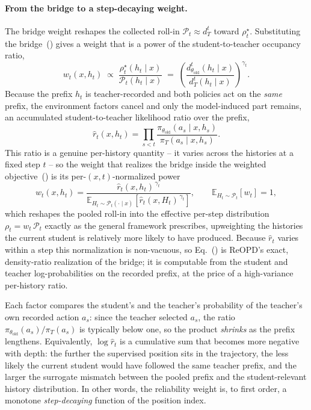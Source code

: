 \paragraph{From the bridge to a step-decaying weight.}
The bridge weight reshapes the collected roll-in \(\mathcal P_t\approx d_T^{t}\)
toward \(\rho_t^\star\). Substituting the bridge~() gives a weight that
is a power of the student-to-teacher occupancy ratio,
\[
w_t(x,h_t)
\;\propto\;
\frac{\rho_t^\star(h_t\mid x)}{\mathcal P_t(h_t\mid x)}
\;=\;
\left(\frac{d_{\theta_{\mathrm{old}}}^{t}(h_t\mid x)}{d_T^{t}(h_t\mid x)}\right)^{\gamma_t}.
\]
Because the prefix \(h_t\) is teacher-recorded and both policies act on the
\emph{same} prefix, the environment factors cancel and only the model-induced part
remains, an accumulated student-to-teacher likelihood ratio over the prefix,
\[
\widehat r_t(x,h_t)
=
\prod_{s<t}
\frac{\pi_{\theta_{\mathrm{old}}}(a_s\mid x,h_s)}{\pi_T(a_s\mid x,h_s)}.
\]
This ratio is a genuine per-history quantity -- it varies across the histories at a
fixed step \(t\) -- so the weight that realizes the bridge inside the weighted
objective~() is its per-\((x,t)\)-normalized power
\begin{equation}
\label{eq:exact-weight}
w_t(x,h_t)
=
\frac{\widehat r_t(x,h_t)^{\,\gamma_t}}
{\mathbb E_{H_t\sim\mathcal P_t(\cdot\mid x)}\!\left[\widehat r_t(x,H_t)^{\,\gamma_t}\right]},
\qquad
\mathbb E_{H_t\sim\mathcal P_t}[w_t]=1,
\end{equation}
which reshapes the pooled roll-in into the effective per-step distribution
\(\rho_t=w_t\,\mathcal P_t\) exactly as the general framework prescribes, upweighting
the histories the current student is relatively more likely to have produced. Because
\(\widehat r_t\) varies within a step this normalization is non-vacuous, so
Eq.~() is ReOPD's exact, density-ratio realization of the
bridge; it is computable from the student and teacher log-probabilities on the
recorded prefix, at the price of a high-variance per-history ratio.

Each factor compares the student's and the teacher's probability of the teacher's
own recorded action \(a_s\): since the teacher selected \(a_s\), the ratio
\(\pi_{\theta_{\mathrm{old}}}(a_s)/\pi_T(a_s)\) is typically below one, so the product
\emph{shrinks} as the prefix lengthens. Equivalently, \(\log\widehat r_t\) is a
cumulative sum that becomes more negative with depth: the further the supervised
position sits in the trajectory, the less likely the current student would have
followed the same teacher prefix, and the larger the surrogate mismatch between the
pooled prefix and the student-relevant history distribution. In other words, the
reliability weight is, to first order, a monotone \emph{step-decaying} function of the
position index.

